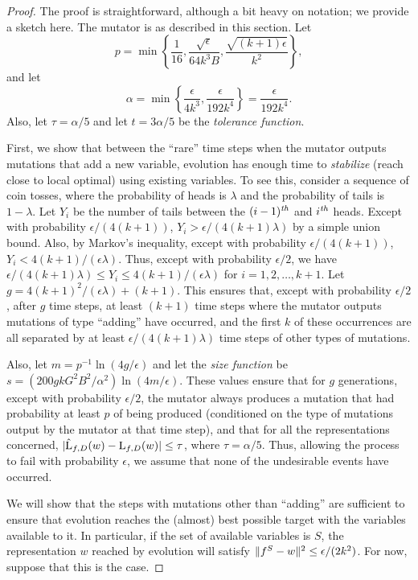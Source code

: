 \begin{proof} The proof is straightforward, although a bit heavy on notation; we
provide a sketch here. The mutator is as described in this section. Let
\[ p = \min \left\{ \frac{1}{16}, \frac{\sqrt{\epsilon}}{64 k^3 B},
\frac{\sqrt{(k+1)\epsilon}}{k^2} \right\}, \]
and let
\[ \alpha = \min \left\{ \frac{\epsilon}{4k^3}, \frac{\epsilon}{192k^4} \right\}
= \frac{\epsilon}{192k^4}. \]
Also, let $\tau = \alpha/5$ and let $t = 3\alpha/5$ be the \emph{tolerance
function}.

First, we show that between the ``rare'' time steps when the mutator outputs
mutations that add a new variable, evolution has enough time to \emph{stabilize}
(reach close to local optimal) using existing variables. To see this, consider a
sequence of coin tosses, where the probability of heads is $\lambda$ and the
probability of tails is $1 - \lambda$. Let $Y_i$ be the number of tails between
the $(i-1){^{\textit{th}}}$ and $i{^{\textit{th}}}$ heads. Except with probability $\epsilon/(4(k+1))$,
$Y_i > \epsilon/(4(k+1)\lambda)$ by a simple union bound.  Also, by Markov's
inequality, except with probability $\epsilon/(4(k+1))$, $Y_i <
4(k+1)/(\epsilon\lambda)$. Thus, except with probability $\epsilon/2$, we have
$\epsilon/(4(k+1)\lambda) \leq Y_i \leq 4(k+1)/(\epsilon\lambda)$ for $i = 1, 2,
\ldots, k+1$. Let $g = 4(k+1)^2/(\epsilon\lambda) + (k+1)$. This ensures that,
except with probability $\epsilon/2$, after $g$ time steps, at least $(k+1)$
time steps where the mutator outputs mutations of type ``adding'' have occurred,
and the first $k$ of these occurrences are all separated by at least
$\epsilon/(4(k+1) \lambda)$ time steps of other types of mutations.

Also, let $m = p^{-1}\ln(4g/\epsilon)$ and let the \emph{size function} be $s =
(200gkG^2B^2/\alpha^2) \ln(4m/\epsilon)$.  These values ensure that for $g$
generations, except with probability $\epsilon/2$, the mutator always produces a
mutation that had probability at least $p$ of being produced (conditioned on the
type of mutations output by the mutator at that time step), and that for all the
representations concerned, $|\hat{\mathrm{L}}_{f, D}(w) - \mathrm{L}_{f, D}(w)| \leq
\tau$, where $\tau = \alpha/5$. Thus, allowing the process to fail with
probability $\epsilon$, we assume that none of the undesirable events have
occurred.

We will show that the steps with mutations other than ``adding'' are sufficient
to ensure that evolution reaches the (almost) best possible target with the
variables available to it. In particular, if the set of available variables is
$S$, the representation $w$ reached by evolution will satisfy $\Vert f^S -
w \Vert^2 \leq \epsilon/(2k^2)$. For now, suppose that this is the case. 


\end{proof}

